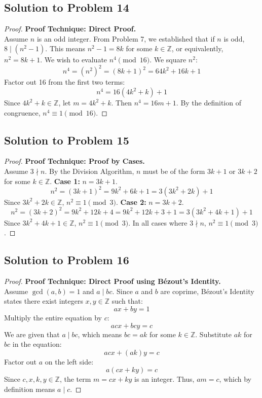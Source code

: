 \documentclass[12pt]{article}
\begin{document}
\subsection{Solution to Problem 14}
\begin{proof}
\textbf{Proof Technique: Direct Proof.} \\
Assume $n$ is an odd integer. From Problem 7, we established that if $n$ is odd, $8 \mid (n^2 - 1)$. This means $n^2 - 1 = 8k$ for some $k \in \mathbb{Z}$, or equivalently, $n^2 = 8k + 1$.
We wish to evaluate $n^4 \pmod{16}$. We square $n^2$:
\[ n^4 = (n^2)^2 = (8k + 1)^2 = 64k^2 + 16k + 1 \]
Factor out 16 from the first two terms:
\[ n^4 = 16(4k^2 + k) + 1 \]
Since $4k^2 + k \in \mathbb{Z}$, let $m = 4k^2 + k$. Then $n^4 = 16m + 1$. By the definition of congruence, $n^4 \equiv 1 \pmod{16}$.
\end{proof}

\subsection{Solution to Problem 15}
\begin{proof}
\textbf{Proof Technique: Proof by Cases.} \\
Assume $3 \nmid n$. By the Division Algorithm, $n$ must be of the form $3k + 1$ or $3k + 2$ for some $k \in \mathbb{Z}$.
\textbf{Case 1:} $n = 3k + 1$.
\[ n^2 = (3k + 1)^2 = 9k^2 + 6k + 1 = 3(3k^2 + 2k) + 1 \]
Since $3k^2 + 2k \in \mathbb{Z}$, $n^2 \equiv 1 \pmod 3$.
\textbf{Case 2:} $n = 3k + 2$.
\[ n^2 = (3k + 2)^2 = 9k^2 + 12k + 4 = 9k^2 + 12k + 3 + 1 = 3(3k^2 + 4k + 1) + 1 \]
Since $3k^2 + 4k + 1 \in \mathbb{Z}$, $n^2 \equiv 1 \pmod 3$.
In all cases where $3 \nmid n$, $n^2 \equiv 1 \pmod 3$.
\end{proof}

\subsection{Solution to Problem 16}
\begin{proof}
\textbf{Proof Technique: Direct Proof using B\'ezout's Identity.} \\
Assume $\gcd(a, b) = 1$ and $a \mid bc$. Since $a$ and $b$ are coprime, B\'ezout's Identity states there exist integers $x, y \in \mathbb{Z}$ such that:
\[ ax + by = 1 \]
Multiply the entire equation by $c$:
\[ acx + bcy = c \]
We are given that $a \mid bc$, which means $bc = ak$ for some $k \in \mathbb{Z}$. Substitute $ak$ for $bc$ in the equation:
\[ acx + (ak)y = c \]
Factor out $a$ on the left side:
\[ a(cx + ky) = c \]
Since $c, x, k, y \in \mathbb{Z}$, the term $m = cx + ky$ is an integer. Thus, $am = c$, which by definition means $a \mid c$.
\end{proof}
\end{document}

